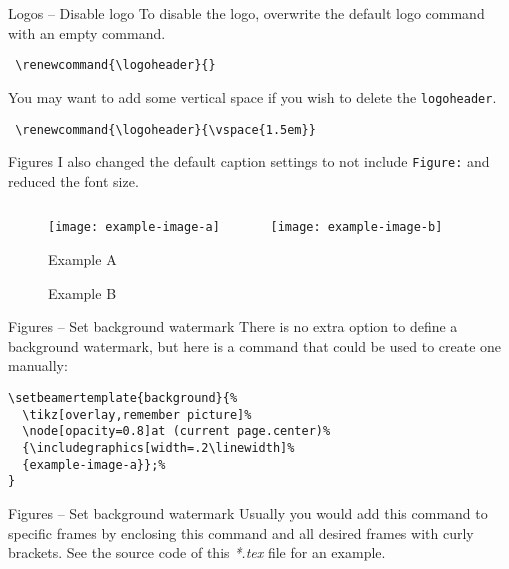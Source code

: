 \documentclass[aspectratio=169]{beamer}                    %
\begin{document}
\begin{frame}[fragile]{Logos -- Disable logo}
	To disable the logo, overwrite the default logo command with an empty
	command.
	\begin{verbatim}
 \renewcommand{\logoheader}{}
  \end{verbatim}
	You may want to add some vertical space if you wish to delete the \texttt{logoheader}.
	\begin{verbatim}
 \renewcommand{\logoheader}{\vspace{1.5em}}
  \end{verbatim}
\end{frame}

\begin{frame}{Figures}
	I also changed the default caption settings to not
	include \texttt{Figure:} and reduced the font size.
	\begin{figure}[H]
		\centering
		\begin{columns}[T]
			\begin{column}{.3\linewidth}
				\texttt{[image: example-image-a]}
				\caption{Example A}
			\end{column}
			\begin{column}{.3\linewidth}
				\texttt{[image: example-image-b]}
				\caption{Example B}
			\end{column}
		\end{columns}
	\end{figure}
\end{frame}

\begin{frame}[fragile]{Figures -- Set background watermark}
	There is no extra option to define a background watermark, but here
	is a command that could be used to create one manually:
	\vfill
	\begin{verbatim}
\setbeamertemplate{background}{%
  \tikz[overlay,remember picture]%
  \node[opacity=0.8]at (current page.center)%
  {\includegraphics[width=.2\linewidth]%
  {example-image-a}};%
}
  \end{verbatim}
\end{frame}

{
\begin{frame}{Figures -- Set background watermark}
	Usually you would add this command to specific
	frames by enclosing this command and all desired frames with
	curly brackets.
	\vfill
	See the source code of this \emph{*.tex} file for an
	example.
\end{frame}
}
\end{document}

